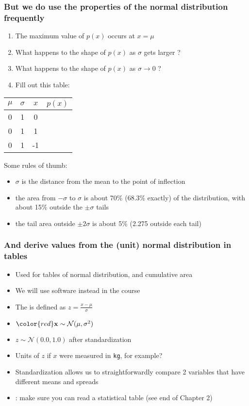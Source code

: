 \begin{frame}\frametitle{But we do use the properties of the normal distribution frequently}
	\begin{enumerate}
		\item	The maximum value of $p(x)$ occurs at $x = \mu$
		\item	What happens to the shape of $p(x)$ as $\sigma$ gets larger ?
		\item	What happens to the shape of $p(x)$ as $\sigma \rightarrow 0$ ?
		\item	Fill out this table:
	\end{enumerate}
	\begin{center}
		\begin{tabular}{|c|c|c|c|}\hline
			$\mu$		&	$\sigma$ 	&	$x$		&	$p(x)$\\ \hline
			0 			&  	1			& 	0 		&		  \\ \hline
			0 			&	1			& 	1		&  		  \\ \hline
			0 			&	1			& 	-1		&  		  \\ \hline
		\end{tabular}

	\end{center}
	Some rules of thumb:
	\begin{itemize}
		\item	$\sigma$ is the distance from the mean to the point of inflection
		\item	the area from $-\sigma$ to $\sigma$ is about 70\% (68.3\% exactly) of the distribution, with about 15\% outside the $\pm \sigma$ tails
		\item	the tail area outside $\pm 2\sigma$ is about 5\% (2.275 outside each tail)
	\end{itemize}
\end{frame}

\begin{frame}\frametitle{And derive values from the (unit) normal distribution in tables}
	\begin{itemize}
		\item	Used for tables of normal distribution, and cumulative area
		\item	We will use software instead in the course
		\item	The {\color{purple}{standard form}} is defined as $ z = \displaystyle \frac{x - \mu}{\sigma} $
		\item	${\color{red} \mathbf{x}} \sim \mathcal{N}(\mu, \sigma^2)$ \hfill {\color{myOrange}{$\longleftarrow$ do not use the standard deviation, use $\sigma^2$}}
		\item	$z \sim \mathcal{N}(0.0, 1.0)$ after standardization
		\item	Units of $z$ if $x$ were measured in \texttt{kg}, for example?
		\item	Standardization allows us to straightforwardly compare 2 variables that have different means and spreads
		\item	{\color{red}{Recommendation}}: make sure you can read a statistical table (see end of Chapter 2)
	\end{itemize}
\end{frame}


